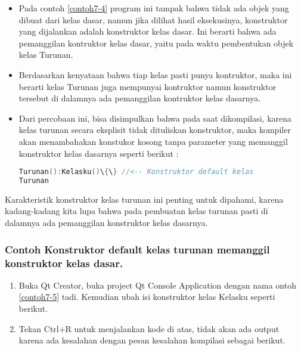 \begin{itemize}
\item
  Pada contoh \ref{contoh7-4} program ini tampak bahwa tidak ada objek yang dibuat dari
  kelas dasar, namun jika dilihat hasil eksekusinya, konstruktor yang
  dijalankan adalah konstruktor kelas dasar. Ini berarti bahwa ada
  pemanggilan kontruktor kelas dasar, yaitu pada waktu pembentukan objek
  kelas Turunan.
\item
  Berdasarkan kenyataan bahwa tiap kelas pasti punya kontruktor, maka
  ini berarti kelas Turunan juga mempunyai kontruktor namun konstruktor
  tersebut di dalamnya ada pemanggilan kontruktor kelas dasarnya.
\item
  Dari percobaan ini, bisa disimpulkan bahwa pada saat dikompilasi,
  karena kelas turunan secara eksplisit tidak dituliskan konstruktor,
  maka kompiler akan menambahakan konstukor kosong tanpa parameter yang
  memanggil konstruktor kelas dasarnya seperti berikut :

\begin{lstlisting}[language=c++, numbers=none]
Turunan():Kelasku()\{\} //<-- Konstruktor default kelas
Turunan
\end{lstlisting}
  
\end{itemize}

Karakteristik konstruktor kelas turunan ini penting untuk dipahami,
karena kadang-kadang kita lupa bahwa pada pembuatan kelas turunan pasti
di dalamnya ada pemanggilan konstruktor kelas dasarnya.

\subsubsection*{Contoh  Konstruktor default kelas turunan memanggil konstruktor kelas dasar.}

\begin{enumerate}

\item
  Buka Qt Creator, buka project Qt Console Application dengan nama
  ontoh \ref{contoh7-5} tadi. Kemudian ubah isi konstruktor kelas Kelasku seperti
  berikut.



\item
  Tekan Ctrl+R untuk menjalankan kode di atas, tidak akan ada output
  karena ada kesalahan dengan pesan kesalahan kompilasi sebagai berikut.
\end{enumerate}

